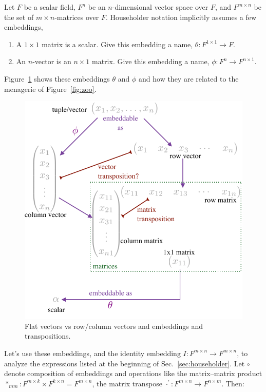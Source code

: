 Let $F$ be a scalar field, $F^n$ be an $n$-dimensional vector space over $F$, and $F^{m\times n}$ be the set of $m\times n$-matrices over $F$.
Householder notation implicitly assumes a few embeddings,

\begin{enumerate}
\item
A $1\times1$ matrix is a scalar.
Give this embedding a name, $\theta:F^{1\times1}\rightarrow F$.

\item
An $n$-vector is an $n\times1$ matrix.
Give this embedding a name,
$\phi:F^n\rightarrow F^{n\times1}$.
\end{enumerate}

Figure~\ref{fig:embed} shows these embeddings $\theta$ and $\phi$ and how they are related to the menagerie of Figure~\ref{fig:zoo}.

\begin{figure}
\label{fig:embed}
\caption{Flat vectors vs row/column vectors and embeddings and transpositions.}

\centering{}\includegraphics[width=0.9\columnwidth]{figures/fig-embed}
\end{figure}

Let's use these embeddings, and the identity embedding $I:F^{m\times n}\rightarrow F^{m\times n}$, to analyze the expressions listed at the beginning of Sec.~\ref{sec:householder}. Let $\circ$ denote composition of embeddings and operations like the matrix–matrix
product $*_{mm}:F^{m\times k}\times F^{k\times n}=F^{m\times n}$,
the matrix transpose $\cdot^\prime:F^{m\times n}\rightarrow F^{n\times m}$. Then:


